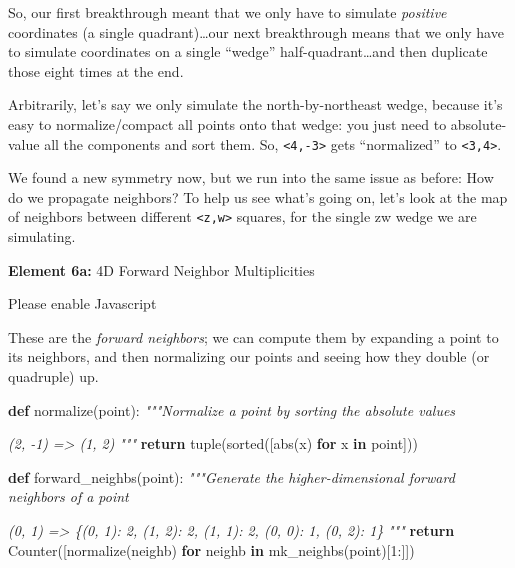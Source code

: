 \documentclass[]{article}
\newenvironment{Shaded}{}{}
\newcommand{\BuiltInTok}[1]{#1}
\newcommand{\CommentTok}[1]{\textcolor[rgb]{0.38,0.63,0.69}{\textit{#1}}}
\newcommand{\ControlFlowTok}[1]{\textcolor[rgb]{0.00,0.44,0.13}{\textbf{#1}}}
\newcommand{\DecValTok}[1]{\textcolor[rgb]{0.25,0.63,0.44}{#1}}
\newcommand{\KeywordTok}[1]{\textcolor[rgb]{0.00,0.44,0.13}{\textbf{#1}}}
\newcommand{\NormalTok}[1]{#1}
\begin{document}
So, our first breakthrough meant that we only have to simulate \emph{positive}
coordinates (a single quadrant)\ldots our next breakthrough means that we only
have to simulate coordinates on a single ``wedge'' half-quadrant\ldots and then
duplicate those eight times at the end.

Arbitrarily, let's say we only simulate the north-by-northeast wedge, because
it's easy to normalize/compact all points onto that wedge: you just need to
absolute-value all the components and sort them. So,
\texttt{\textless{}4,-3\textgreater{}} gets ``normalized'' to
\texttt{\textless{}3,4\textgreater{}}.

We found a new symmetry now, but we run into the same issue as before: How do we
propagate neighbors? To help us see what's going on, let's look at the map of
neighbors between different \texttt{\textless{}z,w\textgreater{}} squares, for
the single zw wedge we are simulating.

\leavevmode\hypertarget{golSyms4DForward}{}%
\textbf{Element 6a:} 4D Forward Neighbor Multiplicities

\leavevmode\hypertarget{golSyms4DForwardCont}{}%
Please enable Javascript

These are the \emph{forward neighbors}; we can compute them by expanding a point
to its neighbors, and then normalizing our points and seeing how they double (or
quadruple) up.

\begin{Shaded}
\begin{Highlighting}[]
\KeywordTok{def}\NormalTok{ normalize(point):}
    \CommentTok{"""Normalize a point by sorting the absolute values}

\CommentTok{    (2, {-}1)}
\CommentTok{    => (1, 2)}
\CommentTok{    """}
    \ControlFlowTok{return} \BuiltInTok{tuple}\NormalTok{(}\BuiltInTok{sorted}\NormalTok{([}\BuiltInTok{abs}\NormalTok{(x) }\ControlFlowTok{for}\NormalTok{ x }\KeywordTok{in}\NormalTok{ point]))}

\KeywordTok{def}\NormalTok{ forward\_neighbs(point):}
    \CommentTok{"""Generate the higher{-}dimensional forward neighbors of a point}

\CommentTok{    (0, 1)}
\CommentTok{    => \{(0, 1): 2, (1, 2): 2, (1, 1): 2, (0, 0): 1, (0, 2): 1\}}
\CommentTok{    """}
    \ControlFlowTok{return}\NormalTok{ Counter([normalize(neighb) }\ControlFlowTok{for}\NormalTok{ neighb }\KeywordTok{in}\NormalTok{ mk\_neighbs(point)[}\DecValTok{1}\NormalTok{:]])}
\end{Highlighting}
\end{Shaded}
\end{document}
